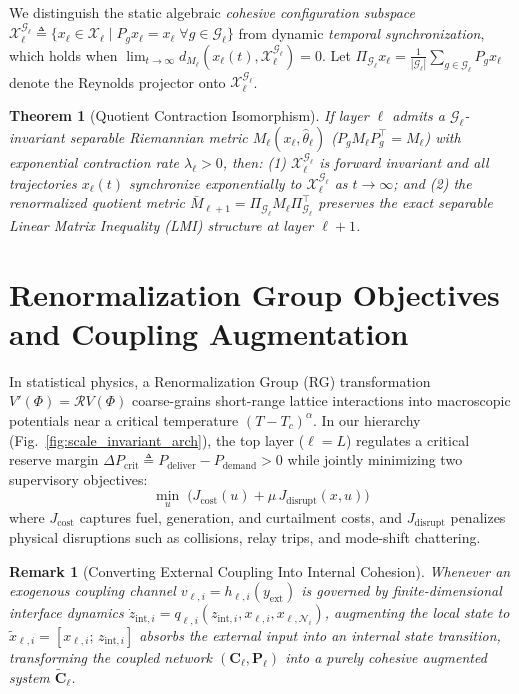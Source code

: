 \documentclass[journal]{IEEEtran}
\newtheorem{theorem}{Theorem}
\newtheorem{remark}{Remark}
\begin{document}
We distinguish the static algebraic \emph{cohesive configuration subspace} $\mathcal{X}_\ell^{\mathcal{G}_\ell} \triangleq \{x_\ell \in \mathcal{X}_\ell \mid P_g x_\ell = x_\ell \;\forall g \in \mathcal{G}_\ell\}$ from dynamic \emph{temporal synchronization}, which holds when $\lim_{t \to \infty} d_{M_\ell}(x_\ell(t), \mathcal{X}_\ell^{\mathcal{G}_\ell}) = 0$. Let $\Pi_{\mathcal{G}_\ell} x_\ell = \frac{1}{|\mathcal{G}_\ell|} \sum_{g \in \mathcal{G}_\ell} P_g x_\ell$ denote the Reynolds projector onto $\mathcal{X}_\ell^{\mathcal{G}_\ell}$.

\begin{theorem}[Quotient Contraction Isomorphism]
If layer $\ell$ admits a $\mathcal{G}_\ell$-invariant separable Riemannian metric $M_\ell(x_\ell, \hat{\theta}_\ell)$ ($P_g M_\ell P_g^\top = M_\ell$) with exponential contraction rate $\lambda_\ell > 0$, then: (1) $\mathcal{X}_\ell^{\mathcal{G}_\ell}$ is forward invariant and all trajectories $x_\ell(t)$ synchronize exponentially to $\mathcal{X}_\ell^{\mathcal{G}_\ell}$ as $t \to \infty$; and (2) the renormalized quotient metric $\bar{M}_{\ell+1} = \Pi_{\mathcal{G}_\ell} M_\ell \Pi_{\mathcal{G}_\ell}^\top$ preserves the exact separable Linear Matrix Inequality (LMI) structure at layer $\ell+1$.
\end{theorem}

\section{Renormalization Group Objectives and Coupling Augmentation}
In statistical physics, a Renormalization Group (RG) transformation $V'(\Phi) = \mathcal{R}V(\Phi)$ coarse-grains short-range lattice interactions into macroscopic potentials near a critical temperature $(T - T_c)^\alpha$. In our hierarchy (Fig.~\ref{fig:scale_invariant_arch}), the top layer ($\ell = L$) regulates a critical reserve margin $\Delta P_{\text{crit}} \triangleq P_{\text{deliver}} - P_{\text{demand}} > 0$ while jointly minimizing two supervisory objectives:
\begin{equation}
\min_{u} \; \Big( J_{\text{cost}}(u) + \mu\, J_{\text{disrupt}}(x, u) \Big)
\end{equation}
where $J_{\text{cost}}$ captures fuel, generation, and curtailment costs, and $J_{\text{disrupt}}$ penalizes physical disruptions such as collisions, relay trips, and mode-shift chattering.

\begin{remark}[Converting External Coupling Into Internal Cohesion]
Whenever an exogenous coupling channel $v_{\ell,i} = h_{\ell,i}(y_{\text{ext}})$ is governed by finite-dimensional interface dynamics $\dot{z}_{\text{int},i} = q_{\ell,i}(z_{\text{int},i}, x_{\ell,i}, x_{\ell,\mathcal{N}_i})$, augmenting the local state to $\tilde{x}_{\ell,i} = [x_{\ell,i};\, z_{\text{int},i}]$ absorbs the external input into an internal state transition, transforming the coupled network $(\mathbf{C}_\ell, \mathbf{P}_\ell)$ into a purely cohesive augmented system $\tilde{\mathbf{C}}_\ell$.
\end{remark}
\end{document}
